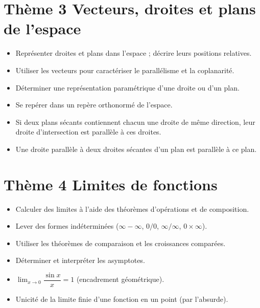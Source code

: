 \documentclass[11pt,a4paper,openany]{book}
\theoremstyle{definition}
\begin{document}
    \section*{Thème 3 \textemdash{} Vecteurs, droites et plans de l'espace}
    \begin{capacitesbox}
    \begin{itemize}
        \item Représenter droites et plans dans l'espace ; décrire leurs
              positions relatives.
        \item Utiliser les vecteurs pour caractériser le parallélisme et la
              coplanarité.
        \item Déterminer une représentation paramétrique d'une droite ou d'un
              plan.
        \item Se repérer dans un repère orthonormé de l'espace.
    \end{itemize}
    \end{capacitesbox}
    \begin{demoprogbox}
    \begin{itemize}
        \item Si deux plans sécants contiennent chacun une droite de même
              direction, leur droite d'intersection est parallèle à ces droites.
        \item Une droite parallèle à deux droites sécantes d'un plan est
              parallèle à ce plan.
    \end{itemize}
    \end{demoprogbox}

    \section*{Thème 4 \textemdash{} Limites de fonctions}
    \begin{capacitesbox}
    \begin{itemize}
        \item Calculer des limites à l'aide des théorèmes d'opérations et de
              composition.
        \item Lever des formes indéterminées ($\infty-\infty$, $0/0$,
              $\infty/\infty$, $0\times\infty$).
        \item Utiliser les théorèmes de comparaison et les croissances
              comparées.
        \item Déterminer et interpréter les asymptotes.
    \end{itemize}
    \end{capacitesbox}
    \begin{demoprogbox}
    \begin{itemize}
        \item $\displaystyle\lim_{x\to 0}\dfrac{\sin x}{x}=1$
              (encadrement géométrique).
        \item Unicité de la limite finie d'une fonction en un point
              (par l'absurde).
    \end{itemize}
    \end{demoprogbox}
\end{document}
